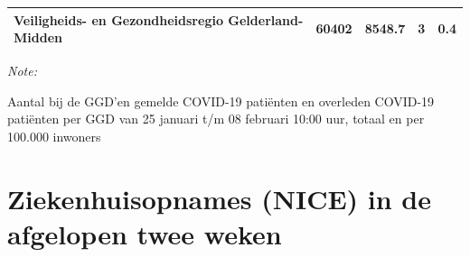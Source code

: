 \documentclass[
  english,
  man,floatsintext]{apa6}
\begin{document}
\begin{table}
\begin{threeparttable}
\begin{tabular}{lrrrr}
Veiligheids- en Gezondheidsregio Gelderland-Midden & 60402 & 8548.7 & 3 & 0.4\\
\bottomrule
\end{tabular}
\begin{tablenotes}
\item \textit{Note: } 
\item Aantal bij de GGD’en gemelde COVID-19 patiënten en overleden COVID-19 patiënten per GGD van 25 januari t/m 08 februari 10:00 uur, totaal en per 100.000 inwoners
\end{tablenotes}
\end{threeparttable}
\endgroup{}
\end{table}

\newpage

\hypertarget{ziekenhuisopnames-nice-in-de-afgelopen-twee-weken}{%
\section{Ziekenhuisopnames (NICE) in de afgelopen twee weken}\label{ziekenhuisopnames-nice-in-de-afgelopen-twee-weken}}
\end{document}
